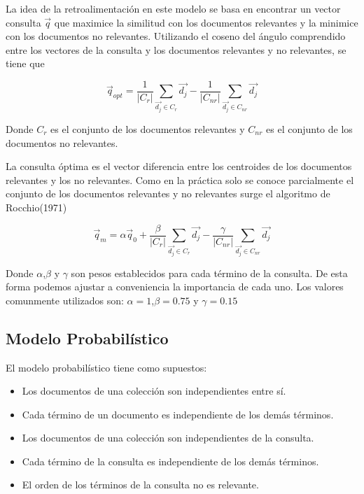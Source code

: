 \documentclass{llncs}
\begin{document}
	La idea de la retroalimentaci\'on en este modelo se basa en encontrar un vector consulta $\overrightarrow{q}$ que maximice la similitud con los documentos relevantes y la minimice con los documentos no relevantes. Utilizando el coseno del \'angulo comprendido entre los vectores de la consulta y los documentos relevantes y no relevantes, se tiene que 
	
	\begin{equation}
	\overrightarrow{q}_{opt} = \frac{1}{|C_r|}\sum_{\overrightarrow{d_j} \in C_r} \overrightarrow{d_j} - \frac{1}{|C_{nr}|}\sum_{\overrightarrow{d_j} \in C_{nr}} \overrightarrow{d_j}
	\end{equation}
	
	Donde $C_r$ es el conjunto de los documentos relevantes y $C_{nr}$ es el conjunto de los documentos no relevantes.
		
	La consulta \'optima es el vector diferencia entre los centroides de los documentos relevantes y los no relevantes. Como en la pr\'actica solo se conoce parcialmente el conjunto de los documentos relevantes y no relevantes surge el algoritmo de Rocchio(1971)
	
	\begin{equation}
	\overrightarrow{q}_m = \alpha\overrightarrow{q}_0 + \frac{\beta}{|C_r|}\sum_{\overrightarrow{d_j} \in C_r} \overrightarrow{d_j} - \frac{\gamma}{|C_{nr}|}\sum_{\overrightarrow{d_j} \in C_{nr}} \overrightarrow{d_j}
	\end{equation}
	
	Donde $\alpha$,$\beta$ y $\gamma$ son pesos establecidos para cada t\'ermino de la consulta. De esta forma podemos ajustar a conveniencia la importancia de cada uno. Los valores comunmente utilizados son: $\alpha=1$,$\beta=0.75$ y $\gamma=0.15$

	\subsection{Modelo Probabil\'istico}
	El modelo probabilístico tiene como supuestos:\\
	\begin{itemize}
		\item Los documentos de una colección son independientes entre sí.
		\item Cada t\'ermino de un documento es independiente de los dem\'as t\'erminos.
		\item Los documentos de una colección son independientes de la consulta.
        \item Cada t\'ermino de la consulta es independiente de los dem\'as t\'erminos.
        \item El orden de los t\'erminos de la consulta no es relevante.
    \end{itemize}
\end{document}
